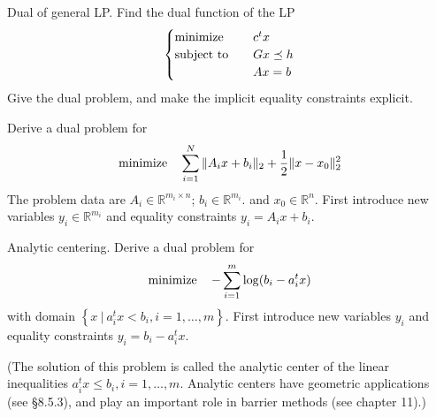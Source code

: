 \begin{problem}[5.5]
    Dual of general LP. Find the dual function of the LP\[\begin{cases}
        \operatorname{minimize} \quad &c^tx\\
        \operatorname{subject\ to} \quad &Gx \preceq h\\
        &Ax = b
    \end{cases}\] Give the dual problem, and make the implicit equality constraints explicit.
\end{problem}

\begin{problem}[5.11]
    Derive a dual problem for \[\operatorname{minimize} \quad \sum_{i = 1}^N \|A_ix + b_i\|_2 + \frac{1}{2}\|x - x_0\|_2^2\] The problem data are $A_i \in \mathbb{R}^{m_i \times n}$; $b_i \in \mathbb{R}^{m_i}$. and $x_0 \in \mathbb{R}^n$. First introduce new variables $y_i \in \mathbb{R}^{m_i}$ and equality constraints $y_i = A_ix + b_i$.
\end{problem}

\begin{problem}[5.12]
    Analytic centering. Derive a dual problem for\[\operatorname{minimize} \quad -\sum_{i = 1}^m \log(b_i - a_i^tx)\] with domain $\left\{x\ |\ a_i^tx < b_i, i = 1, \dots, m\right\}$. First introduce new variables $y_i$ and equality constraints $y_i = b_i - a_i^tx$.

    (The solution of this problem is called the analytic center of the linear inequalities $a_i^tx \le b_i, i = 1, \dots, m$. Analytic centers have geometric applications (see \S8.5.3), and play an important role in barrier methods (see chapter 11).)
\end{problem}


